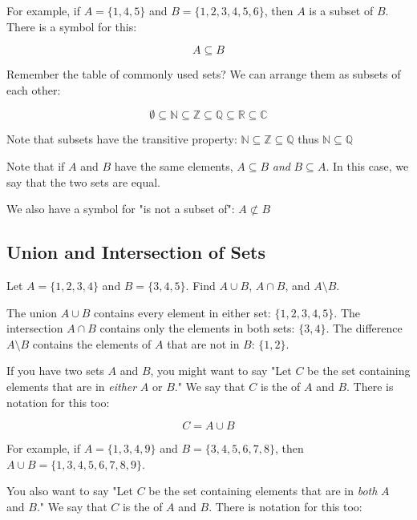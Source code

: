 For example, if $A = \{1,4,5\}$ and $B = \{1,2,3,4,5,6\}$, then $A$ is
a subset of $B$.  There is a symbol for this:

$$ A \subseteq B$$

Remember the table of commonly used sets?  We can arrange them as
subsets of each other:

$$\emptyset \subseteq \mathbb{N} \subseteq \mathbb{Z} \subseteq \mathbb{Q} \subseteq \mathbb{R} \subseteq \mathbb{C}$$

Note that subsets have the transitive property: $\mathbb{N}
\subseteq \mathbb{Z} \subseteq \mathbb{Q}$ thus $\mathbb{N} \subseteq
\mathbb{Q}$

Note that if $A$ and $B$ have the same elements, $A \subseteq B$
\textit{ and } $B \subseteq A$. In this case, we say that the two sets
are equal.

We also have a symbol for "is not a subset of": $A \not\subset B$

\subsection{Union and Intersection of Sets}

\begin{Worked}
\begin{Problem}
Let $A = \{1, 2, 3, 4\}$ and $B = \{3, 4, 5\}$. Find $A \cup B$, $A \cap B$, and $A \setminus B$.
\end{Problem}
\begin{Solution}
The union $A \cup B$ contains every element in either set: $\{1, 2, 3, 4, 5\}$. The intersection $A \cap B$ contains only the elements in both sets: $\{3, 4\}$. The difference $A \setminus B$ contains the elements of $A$ that are not in $B$: $\{1, 2\}$.
\end{Solution}
\end{Worked}


If you have two sets $A$ and $B$, you might want to say "Let $C$ be
the set containing elements that are in \textit{either} $A$ or $B$."
We say that $C$ is the  of $A$ and $B$.  There is
notation for this too:

$$C = A \cup B$$

For example,  if $A = \{1,3,4,9\}$ and $B = \{3,4,5,6,7,8\}$,  then $A \cup B =  \{1,3,4,5,6,7,8,9\}$.

You also want to say "Let $C$ be the set containing elements that are
in \textit{both} $A$ and $B$."  We say that $C$ is the
 of $A$ and $B$.  There is notation for this
too:

